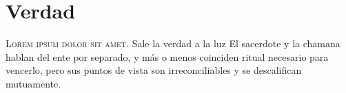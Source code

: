 

\chapter{Verdad}
\lettrine{L}{orem ipsum dolor sit amet}. Sale la verdad a la luz
El sacerdote y la chamana hablan del ente por separado, y más o menos coinciden ritual necesario para vencerlo, pero sus puntos de vista son irreconciliables y se descalifican mutuamente.
